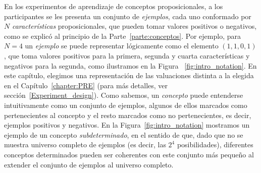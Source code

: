 En los experimentos de aprendizaje de conceptos proposicionales, a los participantes se les presenta un conjunto de \textit{ejemplos}, cada uno conformado por $N$ \textit{características} proposicionales, que pueden tomar valores positivos o negativos, como se explicó al principio de la Parte~\ref{parte:conceptos}. Por ejemplo, para $N=4$ un {\em ejemplo} se puede representar lógicamente como el elemento $(1,1,0,1)$, que toma valores positivos para la primera, segunda y cuarta características y negativos para la segunda, como ilustramos en la Figura ~\ref{fig:intro_notation}. En este capítulo, elegimos una representación de las valuaciones distinta a la elegida en el Capítulo~\ref{chapter:PRE} (para más detalles, ver sección~\ref{Experiment_design}). Como sabemos, un \textit{concepto} puede entenderse intuitivamente como un conjunto de ejemplos, algunos de ellos marcados como pertenecientes al concepto y el resto marcados como no pertenecientes, es decir, ejemplos positivos y negativos. En la Figura~\ref{fig:intro_notation} mostramos un ejemplo de un concepto \textit{subdeterminado}, en el sentido de que, dado que no se muestra universo completo de ejemplos (es decir, las $2^4$ posibilidades), diferentes conceptos determinados pueden ser coherentes con este conjunto más pequeño al extender el conjunto de ejemplos al universo completo.


